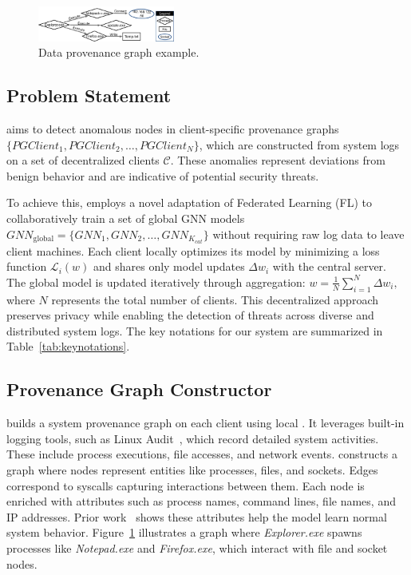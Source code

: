 

\begin{figure}[t!]
  \centering
  \includegraphics[width=0.4\textwidth]{fig/provexp.pdf}
  \caption{Data provenance graph example.}
  \label{provexp}
  \vspace{-3ex}
\end{figure}

\subsection{Problem Statement}

\Sys aims to detect anomalous nodes in client-specific provenance graphs \( \{PGClient_{1}, PGClient_{2}, \ldots, PGClient_{N}\} \), which are constructed from system logs on a set of decentralized clients \( \mathcal{C} \). These anomalies represent deviations from benign behavior and are indicative of potential security threats.

To achieve this, \Sys employs a novel adaptation of Federated Learning (FL) to collaboratively train a set of global GNN models \( {GNN}_{\text{global}} = \{GNN_1, GNN_2, \ldots, GNN_{K_{cat}}\} \) without requiring raw log data to leave client machines. Each client locally optimizes its model by minimizing a loss function \( \mathcal{L}_i(w) \) and shares only model updates \( \Delta w_i \) with the central server. The global model is updated iteratively through aggregation: \( w = \frac{1}{N} \sum_{i=1}^{N} \Delta w_i, \)
where \( N \) represents the total number of clients. This decentralized approach preserves privacy while enabling the detection of threats across diverse and distributed system logs. The key notations for our system are summarized in Table~\ref{tab:keynotations}.



\subsection{Provenance Graph Constructor}
\label{sub:provconstruct}

\Sys builds a system provenance graph on each client using local \logs. It leverages built-in logging tools, such as Linux Audit~\cite{linuxaudit}, which record detailed system activities. These include process executions, file accesses, and network events. \Sys constructs a graph where nodes represent entities like processes, files, and sockets. Edges correspond to syscalls capturing interactions between them. Each node is enriched with attributes such as process names, command lines, file names, and IP addresses. Prior work~\cite{flash2024,cheng2023kairos} shows these attributes help the model learn normal system behavior. Figure~\ref{provexp} illustrates a graph where \textit{Explorer.exe} spawns processes like \textit{Notepad.exe} and \textit{Firefox.exe}, which interact with file and socket nodes.



